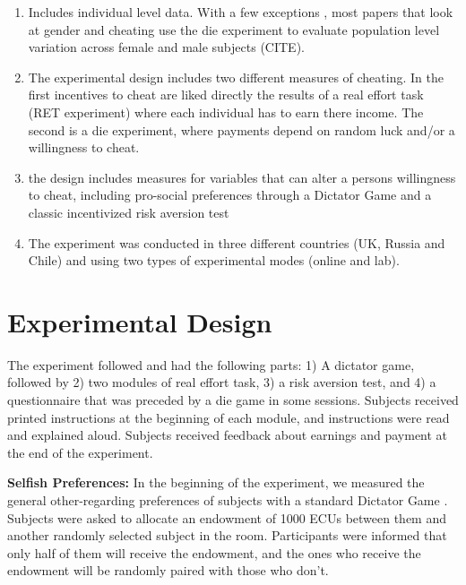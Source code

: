 \documentclass[9pt,twocolumn,twoside]{pnas-new}
\begin{document}
\begin{enumerate}
\item Includes individual level data. With a few exceptions \cite{Dreber_Johannesson_2008}, most papers that look at gender and cheating use the die experiment\cite{Fischbacheretal2013} to evaluate population level variation  across female and male subjects (CITE).
\item The experimental design includes two different measures of cheating. In the first incentives to cheat are liked directly the results of a real effort task (RET experiment) where each individual has to earn there income. The second is a die experiment, where payments depend on random luck and/or a willingness to cheat.
\item the design includes measures for variables that can alter a persons willingness to cheat, including pro-social preferences through a Dictator Game and a classic incentivized risk aversion test\citep{Holtetal2002}%
\item The experiment was conducted in three different countries (UK, Russia and Chile) and using two types of experimental modes (online and lab). 
\end{enumerate}



\section{Experimental Design}

The experiment followed \citep{DuchSolaz2016} and had the following parts: 1) A dictator game, followed by 2) two modules of real effort task, 3) a risk aversion test, and 4) a questionnaire that was preceded by a die game in some sessions. Subjects received printed instructions at the beginning of each module, and instructions were read and explained aloud. Subjects received feedback about earnings and payment at the end of the experiment.  

\textbf{Selfish Preferences:} In the beginning of the experiment, we measured the general other-regarding preferences of subjects with a standard Dictator Game \citep{Engel2011}. Subjects were asked to allocate an endowment of 1000 ECUs between them and another randomly selected subject in the room. Participants were informed that only half of them will receive the endowment, and the ones who receive the
endowment will be randomly paired with those who don't. 
\end{document}
